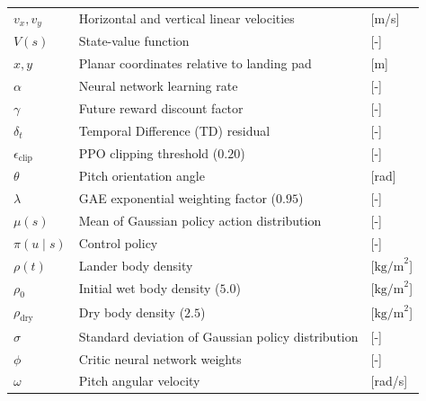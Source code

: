 \begin{longtable}{p{2.5cm}p{9.5cm}p{2.0cm}}
    $v_x, v_y$               & Horizontal and vertical linear velocities          & [m/s]                        \\
    $V(s)$                   & State-value function                               & [-]                          \\
    $x, y$                   & Planar coordinates relative to landing pad         & [m]                          \\
    \midrule
    $\alpha$                 & Neural network learning rate                       & [-]                          \\
    $\gamma$                 & Future reward discount factor                      & [-]                          \\
    $\delta_t$               & Temporal Difference (TD) residual                  & [-]                          \\
    $\epsilon_{\text{clip}}$ & PPO clipping threshold ($0.20$)                    & [-]                          \\
    $\theta$                 & Pitch orientation angle                            & [rad]                        \\
    $\lambda$                & GAE exponential weighting factor ($0.95$)          & [-]                          \\
    $\mu(s)$                 & Mean of Gaussian policy action distribution        & [-]                          \\
    $\pi(u \mid s)$          & Control policy                                     & [-]                          \\
    $\rho(t)$                & Lander body density                                & [$\text{kg/m}^2$]            \\
    $\rho_0$                 & Initial wet body density ($5.0$)                   & [$\text{kg/m}^2$]            \\
    $\rho_{\text{dry}}$      & Dry body density ($2.5$)                           & [$\text{kg/m}^2$]            \\
    $\sigma$                 & Standard deviation of Gaussian policy distribution & [-]                          \\
    $\phi$                   & Critic neural network weights                      & [-]                          \\
    $\omega$                 & Pitch angular velocity                             & [rad/s]                      \\
    \bottomrule
\end{longtable}
